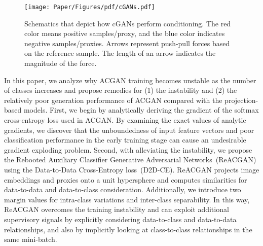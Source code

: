 \documentclass{article}
\begin{document}
\begin{figure}[t]
    \centering
    \texttt{[image: Paper/Figures/pdf/cGANs.pdf]}
    \caption{Schematics that depict how cGANs perform conditioning. The red color means positive samples/proxy, and the blue color indicates negative samples/proxies. Arrows represent push-pull forces based on the reference sample. The length of an arrow indicates the magnitude of the force.}
    \label{fig:Figure_cGANs}
\end{figure} In this paper, we analyze why ACGAN training becomes unstable as the number of classes increases and propose remedies for (1) the instability and (2) the relatively poor generation performance of ACGAN compared with the projection-based models. First, we begin by analytically deriving the gradient of the softmax cross-entropy loss used in ACGAN. By examining the exact values of analytic gradients, we discover that the unboundedness of input feature vectors and poor classification performance in the early training stage can cause an undesirable gradient exploding problem. Second, with alleviating the instability, we propose the Rebooted Auxiliary Classifier Generative Adversarial Networks~(ReACGAN) using the Data-to-Data Cross-Entropy loss~(D2D-CE). ReACGAN projects image embeddings and proxies onto a unit hypersphere and computes similarities for data-to-data and data-to-class consideration. Additionally, we introduce two margin values for intra-class variations and inter-class separability. In this way, ReACGAN overcomes the training instability and can exploit additional supervisory signals by explicitly considering data-to-class and data-to-data relationships, and also by implicitly looking at class-to-class relationships in the same mini-batch.
\end{document}
